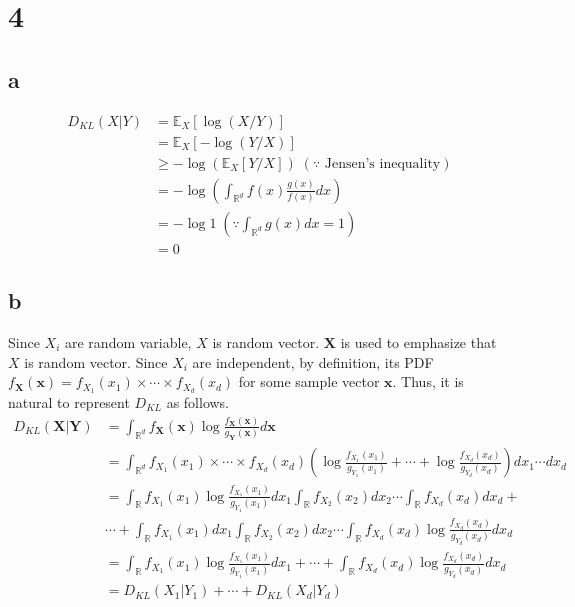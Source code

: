 \documentclass[10pt]{article}
\begin{document}
\section*{4}
\subsection*{a}
\begin{align*}
    D_{KL}(X|Y) &= \mathbb{E}_X\left[\log\left(X/Y\right)\right] \\
    &= \mathbb{E}_X\left[-\log(Y/X)\right]\\
    &\ge -\log\left(\mathbb{E}_X[Y/X]\right) \; (\because \text{ Jensen's inequality})\\
    &= -\log\left(\int_{\mathbb{R}^d} f(x)\frac{g(x)}{f(x)} dx \right) \\
    &= -\log 1 \; \left(\because \int_{\mathbb{R}^d} g(x) dx = 1 \right)\\
    &= 0
\end{align*}
\subsection*{b}
Since $X_i$ are random variable, $X$ is random vector. $\mathbf{X}$ is used to emphasize that $X$ is random vector.
Since $X_i$ are independent, by definition, its PDF $f_{\mathbf{X}}(\mathbf{x}) = f_{X_1}(x_1) \times \cdots \times f_{X_d}(x_d)$ for some sample vector $\mathbf{x}$. 
Thus, it is natural to represent $D_{KL}$ as follows. 
\begin{align*}
    D_{KL}(\mathbf{X}|\mathbf{Y}) &= \int_{\mathbb{R}^d} f_{\mathbf{X}}(\mathbf{x})\log\frac{f_{\mathbf{X}}(\mathbf{x})}{g_{\mathbf{Y}}(\mathbf{x})} d\mathbf{x}\\
    &= \int_{\mathbb{R}^d}f_{X_1}(x_1) \times \cdots \times f_{X_d}(x_d)\left( \log\frac{f_{X_1}(x_1)}{g_{Y_1}(x_1)} + \cdots + \log\frac{f_{X_d}(x_d)}{g_{Y_d}(x_d)}\right) dx_1\cdots dx_d \\
    &= \int_{\mathbb{R}}f_{X_1}(x_1)\log\frac{f_{X_1}(x_1)}{g_{Y_1}(x_1)}dx_1\int_{\mathbb{R}}f_{X_2}(x_2)dx_2 \cdots \int_{\mathbb{R}}f_{X_d}(x_d) dx_d + \\ 
    &\cdots + \int_{\mathbb{R}}f_{X_1}(x_1)dx_1 \int_{\mathbb{R}} f_{X_2}(x_2)dx_2 \cdots \int_{\mathbb{R}}f_{X_d}(x_d)\log\frac{f_{X_d}(x_d)}{g_{Y_d}(x_d)}dx_d \\
    &= \int_{\mathbb{R}}f_{X_1}(x_1)\log\frac{f_{X_1}(x_1)}{g_{Y_1}(x_1)}dx_1 + \cdots + \int_{\mathbb{R}}f_{X_d}(x_d)\log\frac{f_{X_d}(x_d)}{g_{Y_d}(x_d)}dx_d \\
    &= D_{KL}(X_1|Y_1) + \cdots + D_{KL}(X_d|Y_d)
\end{align*}
\end{document}
